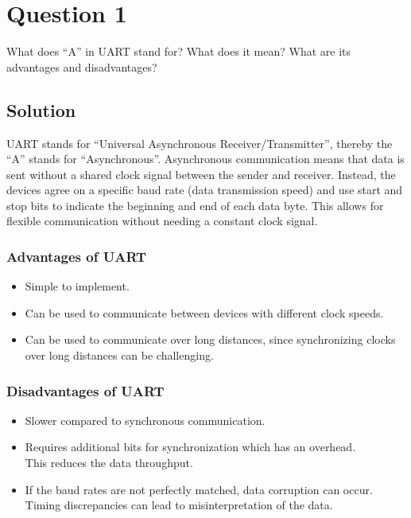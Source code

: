\section*{Question 1}

What does ``A'' in UART stand for?
What does it mean?
What are its advantages and disadvantages?

\subsection*{Solution}

UART stands for ``Universal Asynchronous Receiver/Transmitter'', thereby the ``A'' stands for ``Asynchronous''.
Asynchronous communication means that data is sent without a shared clock signal between the sender and receiver.
Instead, the devices agree on a specific baud rate (data transmission speed) and use start and stop bits to indicate the beginning and end of each data byte.
This allows for flexible communication without needing a constant clock signal.

\subsubsection*{Advantages of UART}
\begin{itemize}[noitemsep]
    \item Simple to implement.
    \item Can be used to communicate between devices with different clock speeds.
    \item Can be used to communicate over long distances, since synchronizing clocks over long distances can be challenging.
\end{itemize}

\subsubsection*{Disadvantages of UART}
\begin{itemize}[noitemsep]
    \item Slower compared to synchronous communication.
    \item Requires additional bits for synchronization which has an overhead. \\
          This reduces the data throughput.
    \item If the baud rates are not perfectly matched, data corruption can occur. \\
          Timing discrepancies can lead to misinterpretation of the data.
\end{itemize}
